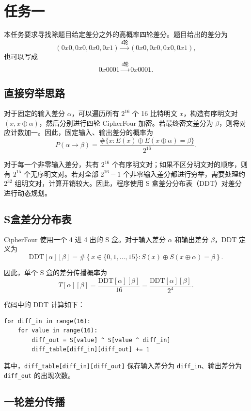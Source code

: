 \section{任务一}

本任务要求寻找除题目给定差分之外的高概率四轮差分。题目给出的差分为
\[
    (0x0,0x0,0x0,0x1)
    \xrightarrow{\text{4轮}}
    (0x0,0x0,0x0,0x1),
\]
也可以写成
\[
    0x0001\xrightarrow{\text{4轮}}0x0001.
\]

\subsection{直接穷举思路}

对于固定的输入差分 $\alpha$，可以遍历所有 $2^{16}$ 个 16 比特明文 $x$，构造有序明文对 $(x,x\oplus\alpha)$，然后分别进行四轮 CipherFour 加密。若最终密文差分为 $\beta$，则将对应计数加一。因此，固定输入、输出差分的概率为
\[
    P(\alpha\rightarrow\beta)
    =
    \frac{\#\{x:E(x)\oplus E(x\oplus\alpha)=\beta\}}{2^{16}}.
\]

对于每一个非零输入差分，共有 $2^{16}$ 个有序明文对；如果不区分明文对的顺序，则有 $2^{15}$ 个无序明文对。若对全部 $2^{16}-1$ 个非零输入差分都进行穷举，需要处理约 $2^{32}$ 组明文对，计算开销较大。因此，程序使用 S 盒差分分布表（DDT）对差分进行动态规划。

\subsection{S盒差分分布表}

CipherFour 使用一个 4 进 4 出的 S 盒。对于输入差分 $\alpha$ 和输出差分 $\beta$，DDT 定义为
\[
    \mathrm{DDT}[\alpha][\beta]
    =
    \#\left\{x\in\{0,1,\ldots,15\}:
    S(x)\oplus S(x\oplus\alpha)=\beta\right\}.
\]

因此，单个 S 盒的差分传播概率为
\[
    T[\alpha][\beta]
    =
    \frac{\mathrm{DDT}[\alpha][\beta]}{16}
    =
    \frac{\mathrm{DDT}[\alpha][\beta]}{2^4}.
\]

代码中的 DDT 计算如下：
\begin{lstlisting}
for diff_in in range(16):
    for value in range(16):
        diff_out = S[value] ^ S[value ^ diff_in]
        diff_table[diff_in][diff_out] += 1
\end{lstlisting}

其中，\texttt{diff\_table[diff\_in][diff\_out]} 保存输入差分为 \texttt{diff\_in}、输出差分为 \texttt{diff\_out} 的出现次数。

\subsection{一轮差分传播}

